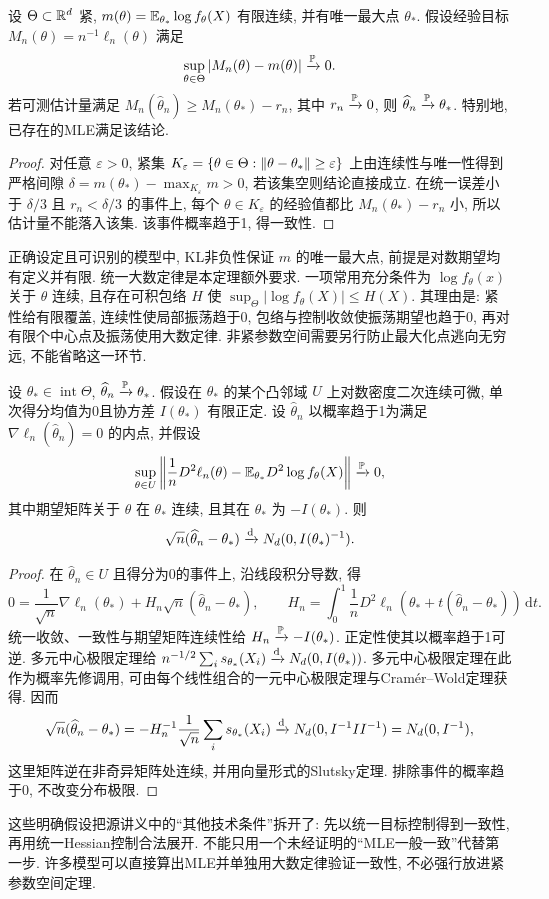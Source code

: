 \begin{theorem}[紧参数空间上的一致性]
设 $\Theta\subset\mathbb R^d$ 紧, $m(\theta)=\mathbb E_{\theta_*}\log f_\theta(X)$ 有限连续, 并有唯一最大点 $\theta_*$. 假设经验目标 $M_n(\theta)=n^{-1}\ell_n(\theta)$ 满足
\[
 \sup_{\theta\in\Theta}|M_n(\theta)-m(\theta)|\xrightarrow{\mathbb P}0.
\]
若可测估计量满足 $M_n(\widehat\theta_n)\ge M_n(\theta_*)-r_n$, 其中 $r_n\xrightarrow{\mathbb P}0$, 则 $\widehat\theta_n\xrightarrow{\mathbb P}\theta_*$. 特别地, 已存在的MLE满足该结论.
\end{theorem}
\begin{proof}
对任意 $\varepsilon>0$, 紧集 $K_\varepsilon=\{\theta\in\Theta:\lVert \theta-\theta_*\rVert\ge\varepsilon\}$ 上由连续性与唯一性得到严格间隙
$\delta=m(\theta_*)-\max_{K_\varepsilon}m>0$, 若该集空则结论直接成立. 在统一误差小于 $\delta/3$ 且 $r_n<\delta/3$ 的事件上, 每个 $\theta\in K_\varepsilon$ 的经验值都比 $M_n(\theta_*)-r_n$ 小, 所以估计量不能落入该集. 该事件概率趋于1, 得一致性.
\end{proof}
正确设定且可识别的模型中, KL非负性保证 $m$ 的唯一最大点, 前提是对数期望均有定义并有限. 统一大数定律是本定理额外要求. 一项常用充分条件为 $\log f_\theta(x)$ 关于 $\theta$ 连续, 且存在可积包络 $H$ 使 $\sup_\Theta|\log f_\theta(X)|\le H(X)$. 其理由是: 紧性给有限覆盖, 连续性使局部振荡趋于0, 包络与控制收敛使振荡期望也趋于0, 再对有限个中心点及振荡使用大数定律. 非紧参数空间需要另行防止最大化点逃向无穷远, 不能省略这一环节.

\begin{theorem}[得分展开的渐近正态性]
设 $\theta_*\in\operatorname{int}\Theta$, $\widehat\theta_n\xrightarrow{\mathbb P}\theta_*$. 假设在 $\theta_*$ 的某个凸邻域 $U$ 上对数密度二次连续可微, 单次得分均值为0且协方差 $I(\theta_*)$ 有限正定. 设 $\widehat\theta_n$ 以概率趋于1为满足 $\nabla\ell_n(\widehat\theta_n)=0$ 的内点, 并假设
\[
 \sup_{\theta\in U}\left\|
 \frac1n D^2\ell_n(\theta)-\mathbb E_{\theta_*}D^2\log f_\theta(X)
 \right\|\xrightarrow{\mathbb P}0,
\]
其中期望矩阵关于 $\theta$ 在 $\theta_*$ 连续, 且其在 $\theta_*$ 为 $-I(\theta_*)$. 则
\[
 \sqrt n(\widehat\theta_n-\theta_*)\xrightarrow{\mathrm d}
 N_d(0,I(\theta_*)^{-1}).
\]
\end{theorem}
\begin{proof}
在 $\widehat\theta_n\in U$ 且得分为0的事件上, 沿线段积分导数, 得
\[
 0=\frac1{\sqrt n}\nabla\ell_n(\theta_*)+
 H_n\sqrt n(\widehat\theta_n-\theta_*),\qquad
 H_n=\int_0^1\frac1nD^2\ell_n(\theta_*+t(\widehat\theta_n-\theta_*))\,\mathrm dt.
\]
统一收敛、一致性与期望矩阵连续性给 $H_n\xrightarrow{\mathbb P}-I(\theta_*)$. 正定性使其以概率趋于1可逆. 多元中心极限定理给
$n^{-1/2}\sum_i s_{\theta_*}(X_i)\xrightarrow{\mathrm d} N_d(0,I(\theta_*))$.
多元中心极限定理在此作为概率先修调用, 可由每个线性组合的一元中心极限定理与Cram\'er--Wold定理获得. 因而
\[
 \sqrt n(\widehat\theta_n-\theta_*)=-H_n^{-1}
 \frac1{\sqrt n}\sum_i s_{\theta_*}(X_i)
 \xrightarrow{\mathrm d} N_d(0,I^{-1}II^{-1})=N_d(0,I^{-1}),
\]
这里矩阵逆在非奇异矩阵处连续, 并用向量形式的Slutsky定理. 排除事件的概率趋于0, 不改变分布极限.
\end{proof}
这些明确假设把源讲义中的“其他技术条件”拆开了: 先以统一目标控制得到一致性, 再用统一Hessian控制合法展开. 不能只用一个未经证明的“MLE一般一致”代替第一步. 许多模型可以直接算出MLE并单独用大数定律验证一致性, 不必强行放进紧参数空间定理.

